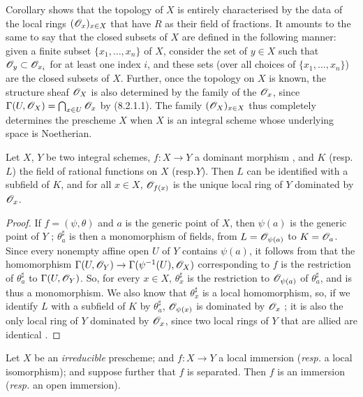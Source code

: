 \begin{env}[8.2.6]
\label{1.8.2.6}
Corollary  shows that the topology of $X$ is
entirely characterised by the data of the local rings $(\mathscr{O}_x)_{x\in X}$ that
have $R$ as their field of fractions. It amounts to the same to say that the
closed subsets of $X$ are defined in the following manner: given a finite subset
$\{x_1,\ldots,x_n\}$ of $X$, consider the set of $y\in X$ such that
$\mathscr{O}_y\subset\mathscr{O}_{x_i}$ for at least one index $i$, and these sets (over all
choices of $\{x_1,\ldots,x_n\}$) are the closed subsets of $X$. Further, once
the topology on $X$ is known, the structure sheaf $\mathscr{O}_X$ is also determined by
the family of the $\mathscr{O}_x$, since $\Gamma(U,\mathscr{O}_X)=\bigcap_{x\in U}\mathscr{O}_x$ by
(8.2.1.1). The family $(\mathscr{O}_X)_{x\in X}$ thus completely determines the
prescheme $X$ when $X$ is an integral scheme whose underlying space is
Noetherian.
\end{env}

\begin{prop}[8.2.7]
\label{1.8.2.7}
Let $X$, $Y$ be two integral schemes, $f:X\to Y$ a dominant morphism
, and $K$ (resp.$L$) the field of rational
functions on $X$ (resp.$Y$). Then $L$ can be identified with a subfield of
$K$, and for all $x\in X$, $\mathscr{O}_{f(x)}$ is the unique local ring of $Y$ dominated
by $\mathscr{O}_x$.
\end{prop}

\begin{proof}
\label{proof-1.8.2.7}
If $f=(\psi,\theta)$ and $a$ is the generic point of $X$, then
$\psi(a)$ is the generic point of $Y$ ; $\theta_a^\sharp$ is then
a monomorphism of fields, from $L=\mathscr{O}_{\psi(a)}$ to $K=\mathscr{O}_a$. Since every
nonempty affine open $U$ of $Y$ contains $\psi(a)$, it follows from
 that the homomorphism $\Gamma(U,\mathscr{O}_Y)\to\Gamma(\psi^{-1}(U),\mathscr{O}_X)$
corresponding to $f$ is the restriction of $\theta_a^\sharp$ to $\Gamma(U,\mathscr{O}_Y)$.
So, for every $x\in X$, $\theta_x^\sharp$ is the restriction to $\mathscr{O}_{\psi(a)}$ of
$\theta_a^\sharp$, and is thus a monomorphism. We also know that $\theta_x^\sharp$ is a
local homomorphism, so, if we identify $L$ with a subfield of $K$ by
$\theta_a^\sharp$, $\mathscr{O}_{\psi(x)}$ is dominated by $\mathscr{O}_x$ ; it is also
the only local ring of $Y$ dominated by $\mathscr{O}_x$, since two local rings of $Y$
that are allied are identical .
\end{proof}

\begin{prop}[8.2.8]
\label{1.8.2.8}
Let $X$ be an \emph{irreducible} prescheme; and
$f:X\to Y$ a local immersion (\emph{resp.} a local isomorphism); and
suppose further that $f$ is separated. Then $f$ is an immersion (\emph{resp.}
an open immersion).
\end{prop}

